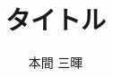\documentclass[titlepage,a4paper]{jsarticle}
\title{タイトル}
\author{本間 三暉}
\begin{document}
\maketitle

\begin{thebibliography}{99}
  \bibitem{}
\end{thebibliography}
\end{document}
